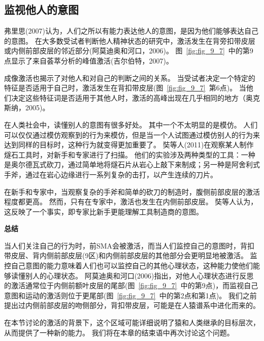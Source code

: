 \subsection{监视他人的意图}
\par
弗里思(2007)认为，人们之所以有能力表达他人的意图，是因为他们能够表达自己的意图。
在大多数受试者判断他人精神状态的研究中，激活发生在背旁扣带皮层或内侧前部皮层的邻近部分(阿莫迪奥和河口，2006)。
图~\ref{fig:fig_9_7}~中的第9点显示了来自荟萃分析的峰值激活(吉尔伯特，2007)。
\par


成像激活也揭示了对他人和对自己的判断之间的关系。
当受试者决定一个特定的特征是否适用于自己时，激活发生在背扣带皮层(图~\ref{fig:fig_9_7}~第6点)。
当他们决定这些特征词是否适用于其他人时，激活的高峰出现在几乎相同的地方（奥克斯纳，2005)。
\par


在人类社会中，读懂别人的意图有很多好处。
其中一个不太明显的是模仿。
人们可以仅仅通过模仿观察到的行为来模仿，但是当一个人试图通过模仿别人的行为来达到同样的目标时，这种行为就变得更加重要了。
奘等人(2011)在观察某人制作燧石工具时，对新手和专家进行了扫描。
他们的实验涉及两种类型的工具：一种是奥尔德瓦式砍刀，通过简单地将燧石片从岩心上敲下来制成；另一种是阿舍利式手斧，通过在岩心边缘进行一系列复杂的击打，以产生连续的刀片。
\par


在新手和专家中，当观察复杂的手斧和简单的砍刀的制造时，腹侧前部皮层的激活程度都更高。
然而，只有在专家中，激活也发生在内侧前部皮层。
奘等人认为，这反映了一个事实，即专家比新手更能理解工具制造商的意图。
\par


\textbf{总结}
\par

当人们关注自己的行为时，前SMA会被激活，而当人们监控自己的意图时，背扣带皮层、背内侧前部皮层(9区)和内侧前部皮层的其他部分会更明显地被激活。
监控自己意图的能力意味着人们也可以监控自己的其他心理状态，这种能力使他们能够读懂别人的心理状态。
阿莫迪奥和河口(2006)指出，对他人心理状态进行反思的激活通常位于内侧前额叶皮层的尾部(图~\ref{fig:fig_9_7}~中的第9点)，而监视自己意图和运动的激活则位于更尾部(图~\ref{fig:fig_9_7}~中的第2点和第1点)。
我们之前提出过内侧前部皮层的吻侧部分，背扣带皮层，可能是在人猿谱系中进化而来的。
\par


在本节讨论的激活的背景下，这个区域可能详细说明了猿和人类继承的目标层次，从而提供了一种新的能力。
我们将在本章的结束语中再次讨论这个问题。



